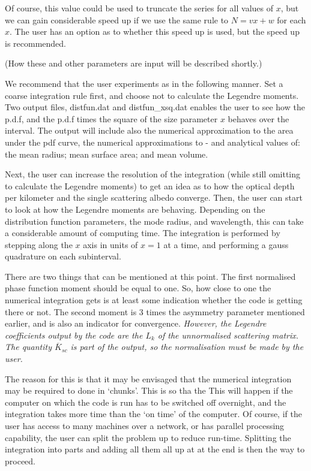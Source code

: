 \begin{flushleft}
 Of course, this value could be used to truncate the series
for all values of $x$, but we can gain considerable speed up if we use the same
rule to $N=v x+w$ for each $x$. The user has an option as to whether this speed up
is used, but the speed up is recommended.

(How these and other parameters are input will be described shortly.)

We recommend that the user experiments as in the following manner. 
Set a coarse
integration rule first, and choose not to calculate the Legendre moments.
Two output files, distfun.dat and  distfun\_xsq.dat  enables the user to see how
the p.d.f, and the p.d.f times the square of the size parameter $x$ behaves over the
interval.
The output
will include also the numerical approximation to the
 area under the pdf curve, the numerical approximations to -  and
analytical values of: the mean radius; mean surface area; and mean volume.

Next, the user can increase the
resolution of the integration (while still omitting to calculate the Legendre
moments) to get an idea as to how the optical depth per kilometer and the single 
scattering albedo converge. Then, the user can start to look at how the
Legendre moments are behaving. Depending on the distribution function parameters,
the  mode radius, and wavelength, this can take a considerable amount of
 computing time. The integration is performed by stepping along the $x$ axis
in units of $x=1$ at a time, and performing a gauss quadrature on each subinterval.  

There are two things that can be mentioned at this point. The first normalised
phase function moment should
be equal to one. So, how close to one the numerical integration gets is at least some
indication whether the code is getting there or not. The second moment is
3 times the asymmetry parameter mentioned earlier, and is also an indicator for
convergence. {\it However, the Legendre coefficients output by the code are the $L_k$
of the unnormalised scattering matrix. The quantity ${\overline K_{sc}}$ is part of the 
output, so the normalisation must be made by the user.}

The reason for this is that it may be envisaged that the numerical integration
may be required to done in `chunks'. This is so tha the
This will happen if the computer on which
the code is run has to be switched off overnight, and the integration takes more
time  than the `on time' of the computer. Of course, if the user has access to many
 machines over a network, or has parallel processing capability, the user can split 
the problem up to reduce run-time.
Splitting the integration into parts
and adding all them all up at at the end is then the way to proceed.


\end{flushleft}
